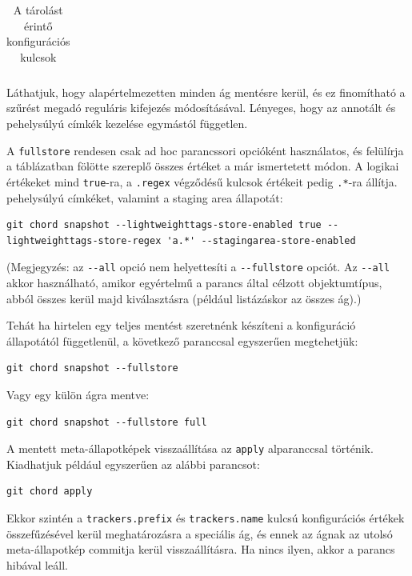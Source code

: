 \documentclass[
]{elteikthesis}[2025/03/25]
\begin{document}
\begin{table}[h]
\begin{center}
\begin{tabular}{|l|l|p{5cm}|}
 \hline

\end{tabular}
\end{center}
\caption{A tárolást érintő konfigurációs kulcsok}
\label{tab:store-config-keys}
\end{table}

Láthatjuk, hogy alapértelmezetten minden ág mentésre kerül,
és ez finomítható a szűrést megadó reguláris kifejezés módosításával.
Lényeges, hogy az annotált és pehelysúlyú címkék kezelése egymástól független.

A \verb|fullstore| rendesen csak ad hoc parancssori opcióként használatos,
és felülírja a táblázatban fölötte szereplő összes értéket a már ismertetett módon.
A logikai értékeket mind \verb|true|-ra,
a \verb|.regex| végződésű kulcsok értékeit pedig \verb|.*|-ra állítja.
pehelysúlyú címkéket,
valamint a staging area állapotát:

\begin{verbatim}
git chord snapshot --lightweighttags-store-enabled true --lightweighttags-store-regex 'a.*' --stagingarea-store-enabled
\end{verbatim}

(Megjegyzés: az \verb|--all| opció nem helyettesíti a \verb|--fullstore| opciót.
Az \verb|--all| akkor használható, amikor egyértelmű a parancs által célzott objektumtípus,
abból összes kerül majd kiválasztásra
(például listázáskor az összes ág).)

Tehát ha hirtelen egy teljes mentést szeretnénk készíteni a konfiguráció állapotától függetlenül,
a következő paranccsal egyszerűen megtehetjük:

\begin{verbatim}
git chord snapshot --fullstore
\end{verbatim}

Vagy egy külön ágra mentve:

\begin{verbatim}
git chord snapshot --fullstore full
\end{verbatim}

A mentett meta-állapotképek visszaállítása az \verb|apply| alparanccsal történik.
Kiadhatjuk például egyszerűen az alábbi parancsot:

\begin{verbatim}
git chord apply
\end{verbatim}

Ekkor szintén a \verb|trackers.prefix| és \verb|trackers.name| kulcsú konfigurációs értékek összefűzésével
kerül meghatározásra a speciális ág,
és ennek az ágnak az utolsó meta-állapotkép commitja kerül visszaállításra.
Ha nincs ilyen, akkor a parancs hibával leáll.
\end{document}

